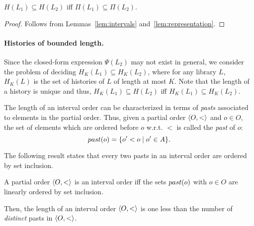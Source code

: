 
\begin{lemma}

  $H(L_1) \subseteq H(L_2)$ iff $\Pi(L_1) \subseteq \Pi(L_2)$.

\end{lemma}

\begin{proof}

  Follows from Lemmas~\ref{lem:intervals} and~\ref{lem:representation}.

\end{proof}

\paragraph{Histories of bounded length.}

Since the closed-form expression $\Psi(L_2)$ may not exist in general, we
consider the problem of deciding $H_K(L_1) \subseteq H_K(L_2)$, where for any
library $L$, $H_K(L)$ is the set of histories of $L$ of length at most $K$.
Note that the length of a history is unique and thus, $H_K(L_1) \subseteq
H(L_2)$ iff $H_K(L_1) \subseteq H_K(L_2)$.

The length of an interval order can be characterized in terms of \emph{pasts}
associated to elements in the partial order. Thus, given a partial order
$\left\langle {O,<} \right\rangle$ and $o\in O$, the set of elements which are ordered before $o$
w.r.t. $<$ is called the \emph{past} of $o$:
\[
\past{o}=\{o' < o\mid o'\in A\}.%
\]


The following result states that every two pasts in an interval order are
ordered by set inclusion.

\begin{lemma}

  A partial order $\left\langle {O,<} \right\rangle$ is an interval order iff the sets $past({o})$ with
  $o\in O$ are linearly ordered by set inclusion.

\end{lemma}

Then, the length of an interval order $\left\langle {O,<} \right\rangle$ is one less than the number
of \emph{distinct} pasts in $\left\langle {O,<} \right\rangle$.

